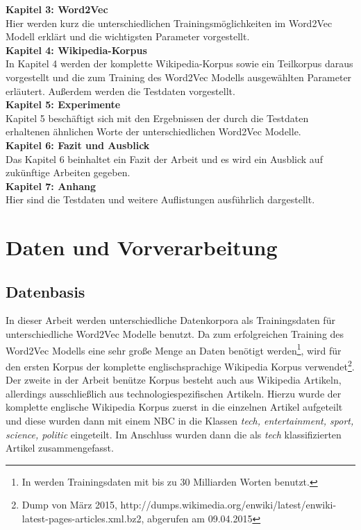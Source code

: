 \documentclass[12pt,a4paper]{report}
\begin{document}
	\textbf{Kapitel 3: Word2Vec}\\
	Hier werden kurz die unterschiedlichen Trainingsmöglichkeiten im Word2Vec Modell erklärt und die wichtigsten Parameter vorgestellt.\\
	
	\textbf{Kapitel 4: Wikipedia-Korpus}\\
	In Kapitel 4 werden der komplette Wikipedia-Korpus sowie ein Teilkorpus daraus vorgestellt und die zum Training des Word2Vec Modells ausgewählten Parameter erläutert. Außerdem werden die Testdaten vorgestellt.\\
	
	\textbf{Kapitel 5: Experimente}\\
	Kapitel 5 beschäftigt sich mit den Ergebnissen der durch die Testdaten erhaltenen ähnlichen Worte der unterschiedlichen Word2Vec Modelle.\\
	
	\textbf{Kapitel 6: Fazit und Ausblick}\\
	Das Kapitel 6 beinhaltet ein Fazit der Arbeit und es wird ein Ausblick auf zukünftige Arbeiten gegeben.\\
	
	\textbf{Kapitel 7: Anhang}\\
	Hier sind die Testdaten und weitere Auflistungen ausführlich dargestellt.\\
	


\newpage
\chapter{Daten und Vorverarbeitung}
	\section{Datenbasis}
	In dieser Arbeit werden unterschiedliche Datenkorpora als Trainingsdaten für unterschiedliche Word2Vec Modelle benutzt. Da zum erfolgreichen Training des Word2Vec Modells eine sehr große Menge an Daten benötigt werden\footnote{In \cite{DBLP:journals/corr/MikolovSCCD13} werden Trainingsdaten mit bis zu 30 Milliarden Worten benutzt.}, wird für den ersten Korpus der komplette englischsprachige Wikipedia Korpus verwendet\footnote{Dump von März 2015, http://dumps.wikimedia.org/enwiki/latest/enwiki-latest-pages-articles.xml.bz2, abgerufen am 09.04.2015}. Der zweite in der Arbeit benütze Korpus besteht auch aus Wikipedia Artikeln, allerdings ausschließlich aus technologiespezifischen Artikeln. Hierzu wurde der komplette englische Wikipedia Korpus zuerst in die einzelnen Artikel aufgeteilt und diese wurden dann mit einem NBC in die Klassen \textit{tech, entertainment, sport, science, politic} eingeteilt. Im Anschluss wurden dann die als \textit{tech} klassifizierten Artikel zusammengefasst.
	
\end{document}
